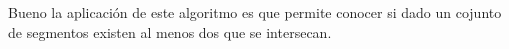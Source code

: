Bueno la aplicación de este algoritmo es que permite conocer si dado un cojunto de segmentos existen al menos dos que se intersecan.